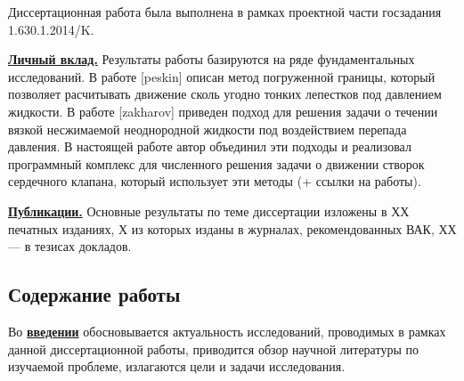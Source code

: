 Диссертационная работа была выполнена в рамках проектной части госзадания 1.630.1.2014/K.

\underline{\textbf{Личный вклад.}} Результаты работы базируются на ряде фундаментальных исследований. В работе [peskin] описан метод погруженной границы,
который позволяет расчитывать движение сколь угодно тонких лепестков под давлением жидкости. В работе [zakharov] приведен подход для решения задачи о течении
вязкой несжимаемой неоднородной жидкости под воздействием перепада давления. В настоящей работе автор объединил эти подходы и реализовал программный комплекс для
численного решения задачи о движении створок сердечного клапана, который использует эти методы (+ ссылки на работы).

\underline{\textbf{Публикации.}} Основные результаты по теме диссертации изложены в ХХ печатных изданиях, Х из которых изданы в журналах, рекомендованных ВАК, ХХ --- в тезисах докладов.


\subsection*{\Large Содержание работы}
Во \underline{\textbf{введении}} обосновывается актуальность исследований, проводимых в рамках данной диссертационной работы, приводится обзор научной литературы по изучаемой проблеме, излагаются цели и задачи исследования.

